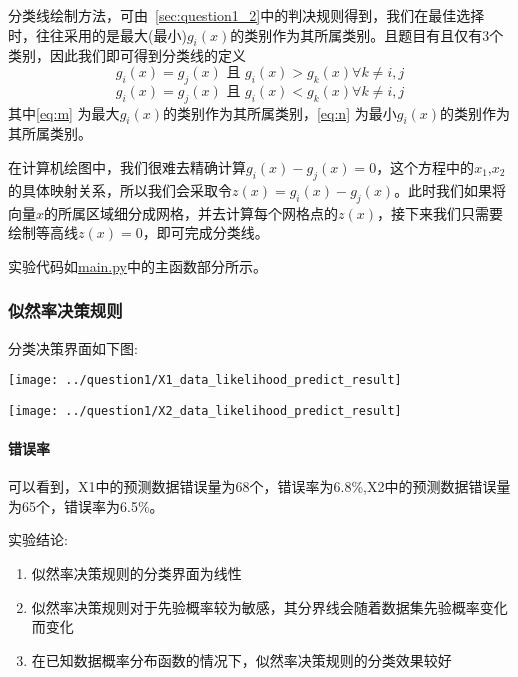 \documentclass[UTF8]{article} %
\begin{document}
    分类线绘制方法，可由~\ref{sec:question1_2}中的判决规则得到，我们在最佳选择时，往往采用的是最大(最小)$g_i(x)$的类别作为其所属类别。且题目有且仅有3个类别，因此我们即可得到分类线的定义
    \begin{equation}
        g_i(x) = g_j(x) \text{ 且 } g_i(x) > g_k(x) \forall k \neq i,j \label{eq:m}
    \end{equation}
    \begin{equation}
        g_i(x) = g_j(x) \text{ 且 } g_i(x) < g_k(x) \forall k \neq i,j \label{eq:n}
    \end{equation}
    其中\eqref{eq:m} 为最大$g_i(x)$的类别作为其所属类别，\eqref{eq:n} 为最小$g_i(x)$的类别作为其所属类别。

    在计算机绘图中，我们很难去精确计算$g_i(x) - g_j(x) = 0$，这个方程中的$x_1$,$x_2$的具体映射关系，所以我们会采取令$z(x) = g_i(x) - g_j(x)$。此时我们如果将向量$x$的所属区域细分成网格，并去计算每个网格点的$z(x)$，接下来我们只需要绘制等高线$z(x) = 0$，即可完成分类线。

    实验代码如\href{run:main.py}{main.py}中的主函数部分所示。

    \subsubsection{似然率决策规则}

    分类决策界面如下图:

    \begin{minipage}[t]{0.5\linewidth}
        \centering
        \texttt{[image: ../question1/X1\_data\_likelihood\_predict\_result]}
        \label{fig:likelihood1} %
    \end{minipage}%
    \begin{minipage}[t]{0.5\linewidth}
        \centering
        \texttt{[image: ../question1/X2\_data\_likelihood\_predict\_result]}
        \label{fig:likelihood2} %
    \end{minipage}

    \paragraph{错误率}

    可以看到，X1中的预测数据错误量为68个，错误率为6.8\%,X2中的预测数据错误量为65个，错误率为6.5\%。

    实验结论:
    \begin{enumerate}
        \item 似然率决策规则的分类界面为线性
        \item 似然率决策规则对于先验概率较为敏感，其分界线会随着数据集先验概率变化而变化
        \item 在已知数据概率分布函数的情况下，似然率决策规则的分类效果较好
    \end{enumerate}
\end{document}
